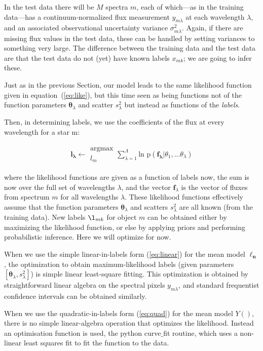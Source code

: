 \documentclass[12pt, preprint]{aastex}
\newcommand{\sectionname}{Section}
\newcommand{\set}[1]{\bm{#1}}
\begin{document}
In the test data there will be $M$ spectra $m$, each of which---as in
the training data---has a continuum-normalized flux measurement
$y_{m\lambda}$ at each wavelength $\lambda$, and an
associated observational uncertainty variance $\sigma_{m\lambda}^2$.
Again, if there are missing flux values in the test data, these can be
handled by setting variances to something very large.
The difference between the training data and the test data are that the
test data do not (yet) have known labels $x_{mk}$; we are going to infer
these.

Just as in the previous \sectionname, our model leads to the same likelihood function given in
equation~(\ref{eq:like}), but this time seen as
being functions not of the function parameters $\set{\theta}_\lambda$ and
scatter $s_\lambda^2$ but instead as functions of the \emph{labels}.

Then, in determining labels, we use the coefficients of the flux at every wavelength for a star m: 

\begin{eqnarray}
\set{l_\lambda} \leftarrow \substack{\mbox{argmax}\\
{l_m}  }
\sum_{\lambda=1}^\Lambda \mbox{ln p}(\set{f_\lambda} | {\theta_1,...\theta_\lambda})
\end{eqnarray}

where the likelihood functions are given as a function of labels now,
the sum is now over the full set of wavelengths
$\lambda$, and the vector $\set{f}_\lambda$ is the vector of fluxes from
spectrum $m$ for all wavelengths $\lambda$.
These likelihood functions effectively assume that the function
parameters $\set{\theta}_\lambda$ and scatters $s_\lambda^2$ are all known (from
the training data).
New labels $\l_{mk}$ for object $m$ can be obtained either by maximizing
the likelihood function, or else by applying priors
and performing probabilistic inference.
Here we will optimize for now.

When we use the simple linear-in-labels form (\ref{eq:linear}) for the
mean model $\set{\ell_n}$, the optimization to obtain maximum-likelihood labels
(given parameters $[\set{\theta}_\lambda, s_\lambda^2]$) is simple linear
least-square fitting.
This optimization is obtained by straightforward linear algebra on the
spectral pixels $y_{m\lambda}$, and standard frequentist confidence
intervals can be obtained similarly.

When we use the quadratic-in-labels form (\ref{eq:quad}) for the
mean model $Y()$, there is no simple linear-algebra operation that
optimizes the likelihood. 
Instead an optimisation function is used, the python curve$\_$fit routine, which uses a non-linear least squares fit to fit the function to the data. 
\end{document}
